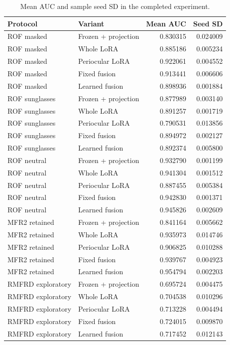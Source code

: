 \documentclass[12pt,a4paper,oneside]{report}
\begin{document}
\begin{table}[htbp]
\centering
\caption{Mean AUC and sample seed SD in the completed experiment.}
\label{tab:thesisregister}
\begin{tabular}{llrr}
\toprule
Protocol & Variant & Mean AUC & Seed SD\\
\midrule
ROF masked & Frozen + projection & 0.830315 & 0.024009\\
ROF masked & Whole LoRA & 0.885186 & 0.005234\\
ROF masked & Periocular LoRA & 0.922061 & 0.004552\\
ROF masked & Fixed fusion & 0.913441 & 0.006606\\
ROF masked & Learned fusion & 0.898936 & 0.001884\\
ROF sunglasses & Frozen + projection & 0.877989 & 0.003140\\
ROF sunglasses & Whole LoRA & 0.891257 & 0.001719\\
ROF sunglasses & Periocular LoRA & 0.790531 & 0.013856\\
ROF sunglasses & Fixed fusion & 0.894972 & 0.002127\\
ROF sunglasses & Learned fusion & 0.892374 & 0.005800\\
ROF neutral & Frozen + projection & 0.932790 & 0.001199\\
ROF neutral & Whole LoRA & 0.941304 & 0.001512\\
ROF neutral & Periocular LoRA & 0.887455 & 0.005384\\
ROF neutral & Fixed fusion & 0.942830 & 0.001371\\
ROF neutral & Learned fusion & 0.945826 & 0.002609\\
MFR2 retained & Frozen + projection & 0.841164 & 0.005662\\
MFR2 retained & Whole LoRA & 0.935973 & 0.014746\\
MFR2 retained & Periocular LoRA & 0.906825 & 0.010288\\
MFR2 retained & Fixed fusion & 0.939767 & 0.004923\\
MFR2 retained & Learned fusion & 0.954794 & 0.002203\\
RMFRD exploratory & Frozen + projection & 0.695724 & 0.004475\\
RMFRD exploratory & Whole LoRA & 0.704538 & 0.010296\\
RMFRD exploratory & Periocular LoRA & 0.713228 & 0.004494\\
RMFRD exploratory & Fixed fusion & 0.724015 & 0.009870\\
RMFRD exploratory & Learned fusion & 0.717452 & 0.012143\\
\bottomrule
\end{tabular}
\end{table}
\end{document}
